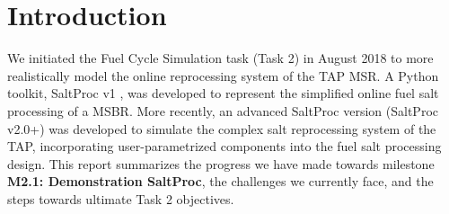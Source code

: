 \documentclass[12pt]{article} %
\begin{document}
\section{Introduction}
We initiated the Fuel Cycle Simulation task (Task 2) in August 2018 to more 
realistically model the online reprocessing system of the \gls{TAP} 
\gls{MSR}. A Python toolkit, SaltProc v1 \cite{rykhlevskii_modeling_2019,
rykhlevskii_advanced_2018, rykhlevskii_arfc/saltproc_2018}, was developed to 
represent the simplified online fuel salt processing of a \gls{MSBR}.
More recently, an advanced SaltProc version (SaltProc v2.0+) was developed 
to simulate the complex salt reprocessing system of the \gls{TAP}, 
incorporating user-parametrized components into the fuel salt processing 
design. This report summarizes the progress we have made towards milestone 
\textbf{M2.1: Demonstration SaltProc}, the challenges we currently face, and 
the steps towards ultimate Task 2 objectives.
\end{document}
